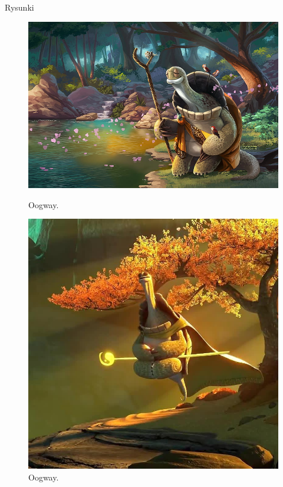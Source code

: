 \documentclass{beamer}
\begin{document}
\begin{frame}{Rysunki}
    \begin{figure}[h]
        \centering
        \begin{minipage}{0.45\textwidth}
            \includegraphics[width=\textwidth]{rysunek2.png}
            \caption{Oogway.}
        \end{minipage}
        \hfill
        \begin{minipage}{0.45\textwidth}
            \includegraphics[width=\textwidth]{rysunek3.png}
            \caption{Oogway.}
        \end{minipage}
    \end{figure}
\end{frame}
\end{document}
